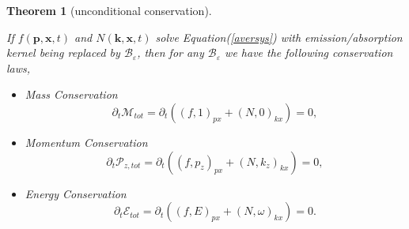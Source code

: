 \documentclass{article}
\newtheorem{theorem}{Theorem}
\numberwithin{equation}{section}
\begin{document}
    \begin{theorem}[unconditional conservation] \label{conserv}

If $f(\mathbf{p}, \mathbf{x}, t)$ and $N(\mathbf{k}, \mathbf{x}, t)$ solve Equation(\ref{aversys}) with emission/absorption kernel being replaced by $\mathcal{B}_{\varepsilon}$, then for any $\mathcal{B}_{\varepsilon}$ we have the following conservation laws,

\begin{itemize}
    \item Mass Conservation
    \begin{equation*}
        \partial_{t}\mathcal{M}_{tot}=\partial_{t}\left((f,1)_{px}+(N,0)_{kx}\right)=0,
    \end{equation*}
    
    \item Momentum Conservation
    \begin{equation*}
        \partial_{t}\mathcal{P}_{z,tot}=\partial_{t}\left((f,p_{z})_{px}+(N,k_{z})_{kx}\right)=0,
    \end{equation*}
    \item Energy Conservation
    \begin{equation*}
        \partial_{t}\mathcal{E}_{tot}=\partial_{t}\left((f,E)_{px}+(N,\omega)_{kx}\right)=0.
    \end{equation*}
    
\end{itemize}
\end{theorem}
\end{document}
